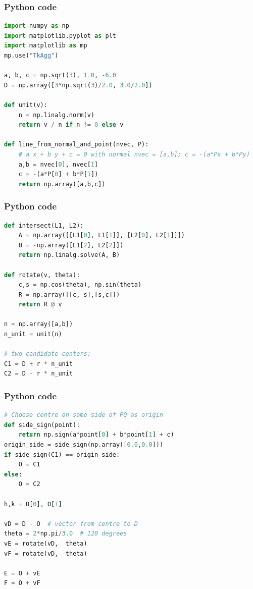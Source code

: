 \documentclass{beamer}
\begin{document}
\begin{frame}[fragile]
    \frametitle{Python code}
    \begin{lstlisting}[language=Python]
import numpy as np
import matplotlib.pyplot as plt
import matplotlib as mp 
mp.use("TkAgg")

a, b, c = np.sqrt(3), 1.0, -6.0           
D = np.array([3*np.sqrt(3)/2.0, 3.0/2.0]) 

def unit(v):
    n = np.linalg.norm(v)
    return v / n if n != 0 else v

def line_from_normal_and_point(nvec, P):
    # a x + b y + c = 0 with normal nvec = [a,b]; c = -(a*Px + b*Py)
    a,b = nvec[0], nvec[1]
    c = -(a*P[0] + b*P[1])
    return np.array([a,b,c])

    \end{lstlisting}   
\end{frame}

\begin{frame}[fragile]
    \frametitle{Python code}
    \begin{lstlisting}[language=Python]
def intersect(L1, L2):
    A = np.array([[L1[0], L1[1]], [L2[0], L2[1]]])
    B = -np.array([L1[2], L2[2]])
    return np.linalg.solve(A, B)

def rotate(v, theta):
    c,s = np.cos(theta), np.sin(theta)
    R = np.array([[c,-s],[s,c]])
    return R @ v

n = np.array([a,b])
n_unit = unit(n)

# two candidate centers:
C1 = D + r * n_unit
C2 = D - r * n_unit
    \end{lstlisting}   
\end{frame}

\begin{frame}[fragile]
    \frametitle{Python code}
    \begin{lstlisting}[language=Python]
# Choose centre on same side of PQ as origin
def side_sign(point):
    return np.sign(a*point[0] + b*point[1] + c)
origin_side = side_sign(np.array([0.0,0.0]))
if side_sign(C1) == origin_side:
    O = C1
else:
    O = C2

h,k = O[0], O[1]

vD = D - O  # vector from centre to D
theta = 2*np.pi/3.0  # 120 degrees
vE = rotate(vD,  theta)
vF = rotate(vD, -theta)

E = O + vE
F = O + vF

    \end{lstlisting}   
\end{frame}
\end{document}
